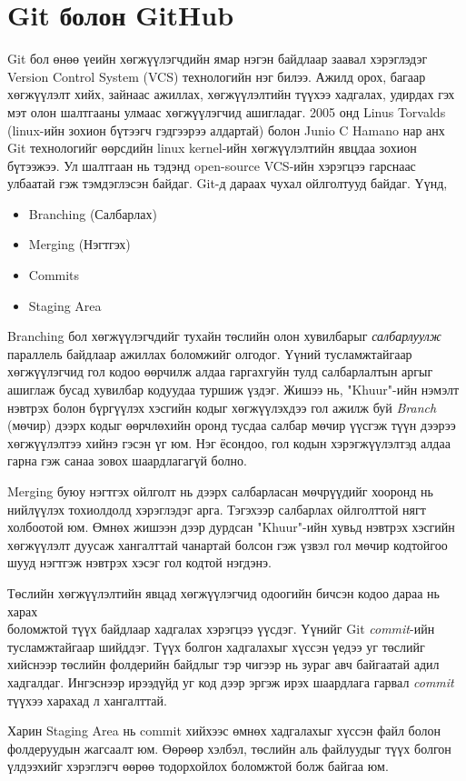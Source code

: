 \section{Git болон GitHub}
Git бол өнөө үеийн хөгжүүлэгчдийн ямар нэгэн байдлаар заавал хэрэглэдэг Version Control System (VCS) технологийн нэг билээ. Ажилд орох, багаар хөгжүүлэлт хийх, зайнаас ажиллах, хөгжүүлэлтийн түүхээ хадгалах, удирдах гэх мэт олон шалтгааны улмаас хөгжүүлэгчид ашигладаг. 2005 онд Linus Torvalds (linux-ийн зохион бүтээгч гэдгээрээ алдартай) болон Junio C Hamano нар анх Git технологийг өөрсдийн linux kernel-ийн хөгжүүлэлтийн явцдаа зохион бүтээжээ. Ул шалтгаан нь тэдэнд open-source VCS-ийн хэрэгцээ гарснаас улбаатай гэж тэмдэглэсэн байдаг.
Git-д дараах чухал ойлголтууд байдаг. Үүнд,
\begin{itemize}
    \item Branching (Салбарлах)
    \item Merging (Нэгтгэх)
    \item Commits
    \item Staging Area
\end{itemize}
\par
Branching бол хөгжүүлэгчдийг тухайн төслийн олон хувилбарыг \emph{салбарлуулж} параллель байдлаар ажиллах боломжийг олгодог. Үүний тусламжтайгаар хөгжүүлэгчид гол кодоо өөрчилж алдаа гаргахгуйн тулд салбарлалтын аргыг ашиглаж бусад хувилбар кодуудаа туршиж үздэг. Жишээ нь, "Khuur"-ийн нэмэлт нэвтрэх болон бүргүүлэх хэсгийн кодыг хөгжүүлэхдээ гол ажилж буй \emph{Branch} (мөчир) дээрх кодыг өөрчлөхийн оронд тусдаа салбар мөчир үүсгэж түүн дээрээ хөгжүүлэлтээ хийнэ гэсэн үг юм. Нэг ёсондоо, гол кодын хэрэгжүүлэлтэд алдаа гарна гэж санаа зовох шаардлагагүй болно. \par
Merging буюу нэгтгэх ойлголт нь дээрх салбарласан мөчрүүдийг хооронд нь нийлүүлэх тохиолдолд хэрэглэдэг арга. Тэгэхээр салбарлах ойлголттой нягт холбоотой юм. Өмнөх жишээн дээр дурдсан "Khuur"-ийн хувьд нэвтрэх хэсгийн хөгжүүлэлт дуусаж хангалттай чанартай болсон гэж үзвэл гол мөчир кодтойгоо шууд нэгтгэж нэвтрэх хэсэг гол кодтой нэгдэнэ.\par
Төслийн хөгжүүлэлтийн явцад хөгжүүлэгчид одоогийн бичсэн кодоо дараа нь харах \\ боломжтой түүх байдлаар хадгалах хэрэгцээ үүсдэг. Үүнийг Git \emph{commit}-ийн тусламжтайгаар шийддэг. Түүх болгон хадгалахыг хүссэн үедээ уг төслийг  хийснээр төслийн фолдерийн байдлыг тэр чигээр нь зураг авч байгаатай адил хадгалдаг. Ингэснээр ирээдүйд уг код дээр эргэж ирэх шаардлага гарвал \emph{commit} түүхээ харахад л хангалттай. \par
Харин Staging Area нь commit хийхээс өмнөх хадгалахыг хүссэн файл болон фолдеруудын жагсаалт юм. Өөрөөр хэлбэл, төслийн аль файлуудыг түүх болгон үлдээхийг хэрэглэгч өөрөө тодорхойлох боломжтой болж байгаа юм. \par


